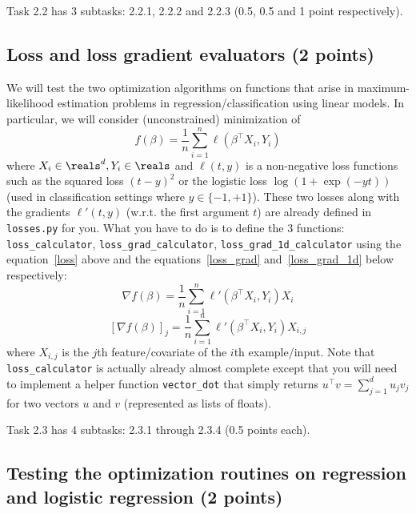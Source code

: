 \documentclass{article}
\begin{document}
Task 2.2 has 3 subtasks: 2.2.1, 2.2.2 and 2.2.3 (0.5, 0.5 and 1 point respectively).

\subsection{Loss and loss gradient evaluators (2 points)}

We will test the two optimization algorithms on functions that arise in maximum-likelihood estimation problems in regression/classification using linear models.
In particular, we will consider (unconstrained) minimization of
\begin{equation}\label{loss}
f(\beta) = \frac{1}{n} \sum_{i=1}^n \ell(\beta^\top X_i, Y_i)
\end{equation}
where $X_i \in \reals^d, Y_i \in \reals$ and $\ell(t, y)$ is a non-negative loss functions such as the squared loss $(t-y)^2$ or the logistic loss
$\log(1+\exp(-yt))$ (used in classification settings where $y \in \{-1,+1\}$). These two losses along with the gradients $\ell'(t,y)$ (w.r.t. the first argument $t$)
are already defined in {\tt losses.py} for you. What you have to do is to define the 3 functions: {\tt loss\_calculator}, {\tt loss\_grad\_calculator},
{\tt loss\_grad\_1d\_calculator} using the equation~\eqref{loss} above and the equations~\eqref{loss_grad} and~\eqref{loss_grad_1d} below respectively:
\begin{equation}\label{loss_grad}
\nabla f(\beta) = \frac{1}{n} \sum_{i=1}^n \ell'(\beta^\top X_i, Y_i) X_i
\end{equation}
\begin{equation}\label{loss_grad_1d}
[\nabla f(\beta)]_j = \frac{1}{n} \sum_{i=1}^n \ell'(\beta^\top X_i, Y_i) X_{i,j}
\end{equation}
where $X_{i,j}$ is the $j$th feature/covariate of the $i$th example/input. Note that {\tt loss\_calculator} is actually already almost complete except that you will
need to implement a helper function {\tt vector\_dot} that simply returns
$u^\top v = \sum_{j=1}^d u_jv_j$ for two vectors $u$ and $v$ (represented as lists of floats).

Task 2.3 has 4 subtasks: 2.3.1 through 2.3.4 (0.5 points each).

\subsection{Testing the optimization routines on regression and logistic regression (2 points)}
\end{document}
